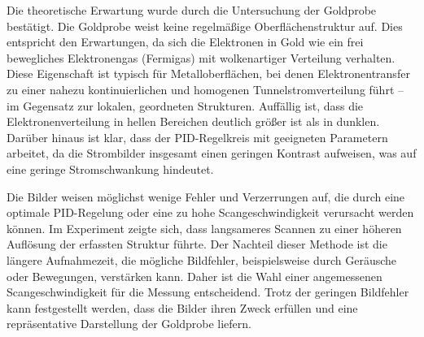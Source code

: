Die theoretische Erwartung wurde durch die Untersuchung der Goldprobe bestätigt. Die Goldprobe weist keine regelmäßige Oberflächenstruktur auf. Dies entspricht den Erwartungen, da sich die Elektronen in Gold wie ein frei bewegliches Elektronengas (Fermigas) mit wolkenartiger Verteilung verhalten. Diese Eigenschaft ist typisch für Metalloberflächen, bei denen Elektronentransfer zu einer nahezu kontinuierlichen und homogenen Tunnelstromverteilung führt – im Gegensatz zur lokalen, geordneten Strukturen. Auffällig ist, dass die Elektronenverteilung in hellen Bereichen deutlich größer ist als in dunklen. Darüber hinaus ist klar, dass der PID-Regelkreis mit geeigneten Parametern arbeitet, da die Strombilder insgesamt einen geringen Kontrast aufweisen, was auf eine geringe Stromschwankung hindeutet. %

Die Bilder weisen möglichst wenige Fehler und Verzerrungen auf, die durch eine optimale PID-Regelung oder eine zu hohe Scangeschwindigkeit verursacht werden können. Im Experiment zeigte sich, dass langsameres Scannen zu einer höheren Auflösung der erfassten Struktur führte. Der Nachteil dieser Methode ist die längere Aufnahmezeit, die mögliche Bildfehler, beispielsweise durch Geräusche oder Bewegungen, verstärken kann. Daher ist die Wahl einer angemessenen Scangeschwindigkeit für die Messung entscheidend. Trotz der geringen Bildfehler kann festgestellt werden, dass die Bilder ihren Zweck erfüllen und eine repräsentative Darstellung der Goldprobe liefern.